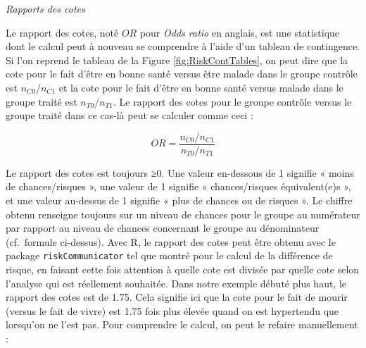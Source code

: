 \documentclass[
]{book}
\newenvironment{Shaded}{\begin{snugshade}}{\end{snugshade}}
\newcommand{\CommentTok}[1]{\textcolor[rgb]{0.56,0.35,0.01}{\textit{#1}}}
\newcommand{\FunctionTok}[1]{\textcolor[rgb]{0.00,0.00,0.00}{#1}}
\newcommand{\NormalTok}[1]{#1}
\newcommand{\OtherTok}[1]{\textcolor[rgb]{0.56,0.35,0.01}{#1}}
\newcommand{\SpecialCharTok}[1]{\textcolor[rgb]{0.00,0.00,0.00}{#1}}
\newcommand{\StringTok}[1]{\textcolor[rgb]{0.31,0.60,0.02}{#1}}
\begin{document}
\emph{Rapports des cotes}

Le rapport des cotes, noté \(OR\) pour \emph{Odds ratio} en anglais, est une statistique dont le calcul peut à nouveau se comprendre à l'aide d'un tableau de contingence. Si l'on reprend le tableau de la Figure \ref{fig:RiskContTables}, on peut dire que la cote pour le fait d'être en bonne santé versus être malade dans le groupe contrôle est \(n_{C0}\)/\(n_{C1}\) et la cote pour le fait d'être en bonne santé versus malade dans le groupe traité est \(n_{T0}\)/\(n_{T1}\). Le rapport des cotes pour le groupe contrôle versus le groupe traité dans ce cas-là peut se calculer comme ceci :

\[ OR=  \frac{n_{C0} / n{_{C1}}}{n_{T0} / n{_{T1}}}\]

Le rapport des cotes est toujours ≥0. Une valeur en-dessous de 1 signifie « moins de chances/risques », une valeur de 1 signifie « chances/risques équivalent(e)s », et une valeur au-dessus de 1 signifie « plus de chances ou de risques ». Le chiffre obtenu renseigne toujours sur un niveau de chances pour le groupe au numérateur par rapport au niveau de chances concernant le groupe au dénominateur (cf.~formule ci-dessus). Avec R, le rapport des cotes peut être obtenu avec le package \texttt{riskCommunicator} tel que montré pour le calcul de la différence de risque, en faisant cette fois attention à quelle cote est divisée par quelle cote selon l'analyse qui est réellement souhaitée. Dans notre exemple débuté plus haut, le rapport des cotes est de 1.75. Cela signifie ici que la cote pour le fait de mourir (versus le fait de vivre) est 1.75 fois plus élevée quand on est hypertendu que lorsqu'on ne l'est pas. Pour comprendre le calcul, on peut le refaire manuellement :

\begin{Shaded}
\end{Shaded}
\end{document}
